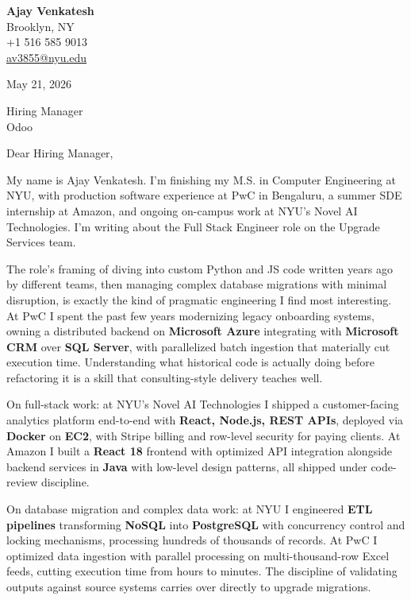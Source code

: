 \documentclass[letterpaper,11pt]{article}
\begin{document}
\begin{flushleft}
\textbf{\large Ajay Venkatesh} \\
Brooklyn, NY \\
+1 516 585 9013 \\
\href{mailto:av3855@nyu.edu}{av3855@nyu.edu}
\end{flushleft}
\vspace{10pt}
May 21, 2026
\vspace{6pt}

Hiring Manager \\
Odoo

\vspace{10pt}

Dear Hiring Manager,

My name is Ajay Venkatesh. I'm finishing my M.S. in Computer Engineering at NYU, with production software experience at PwC in Bengaluru, a summer SDE internship at Amazon, and ongoing on-campus work at NYU's Novel AI Technologies. I'm writing about the Full Stack Engineer role on the Upgrade Services team.

The role's framing of diving into custom Python and JS code written years ago by different teams, then managing complex database migrations with minimal disruption, is exactly the kind of pragmatic engineering I find most interesting. At PwC I spent the past few years modernizing legacy onboarding systems, owning a distributed backend on \textbf{Microsoft Azure} integrating with \textbf{Microsoft CRM} over \textbf{SQL Server}, with parallelized batch ingestion that materially cut execution time. Understanding what historical code is actually doing before refactoring it is a skill that consulting-style delivery teaches well.

On full-stack work: at NYU's Novel AI Technologies I shipped a customer-facing analytics platform end-to-end with \textbf{React, Node.js, REST APIs}, deployed via \textbf{Docker} on \textbf{EC2}, with Stripe billing and row-level security for paying clients. At Amazon I built a \textbf{React 18} frontend with optimized API integration alongside backend services in \textbf{Java} with low-level design patterns, all shipped under code-review discipline.

On database migration and complex data work: at NYU I engineered \textbf{ETL pipelines} transforming \textbf{NoSQL} into \textbf{PostgreSQL} with concurrency control and locking mechanisms, processing hundreds of thousands of records. At PwC I optimized data ingestion with parallel processing on multi-thousand-row Excel feeds, cutting execution time from hours to minutes. The discipline of validating outputs against source systems carries over directly to upgrade migrations.
\end{document}
